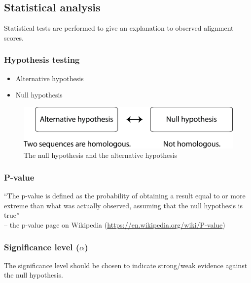 %
%

%
%
\subsection{Statistical analysis}
Statistical tests are performed to give an explanation to observed alignment scores.

%
%
\subsubsection*{Hypothesis testing} 
\begin{itemize}
\item Alternative hypothesis
\item Null hypothesis
\end{itemize}

\begin{figure}[H]
  \centering
      \includegraphics[width=0.6 \textwidth]{fig06/hypotheses.png}
  \caption{The null hypothesis and the alternative hypothesis}
\end{figure}

%
%
\subsubsection*{P-value} 
``The p-value is defined as the probability of obtaining a result equal to or more extreme than what was actually observed, assuming that the null hypothesis is true'' \\

\noindent
-- the p-value page on Wikipedia (\url{https://en.wikipedia.org/wiki/P-value})

%
%
\subsubsection*{Significance level ($\alpha$)} 
The significance level should be chosen to indicate strong/weak evidence against the null hypothesis. \\

